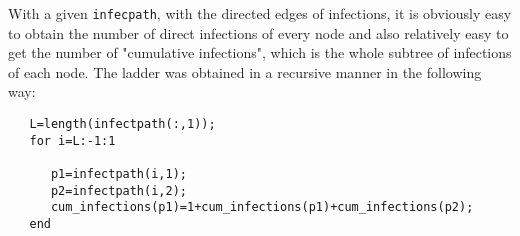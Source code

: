 With a given \texttt{infecpath}, with the directed edges of infections, it is obviously easy to obtain the number of direct infections of every node and also relatively easy to get the number of "cumulative infections", which is the whole subtree of infections of each node. The ladder was obtained in a recursive manner in the following way:

\begin{lstlisting} 
   L=length(infectpath(:,1));
   for i=L:-1:1
      
      p1=infectpath(i,1);
      p2=infectpath(i,2);
      cum_infections(p1)=1+cum_infections(p1)+cum_infections(p2);
   end

\end{lstlisting}



